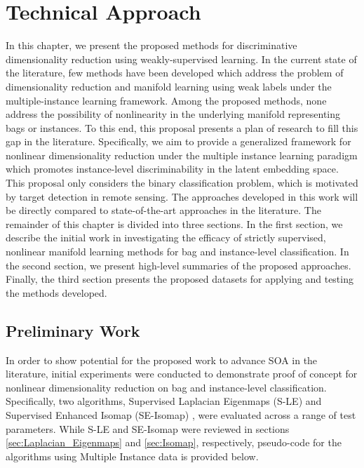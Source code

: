 \chapter{Technical Approach}
In this chapter, we present the proposed methods for discriminative dimensionality reduction using weakly-supervised learning. In the current state of the literature, few methods have been developed which address the problem of dimensionality reduction and manifold learning using weak labels under the multiple-instance learning framework.  Among the proposed methods, none address the possibility of nonlinearity in the underlying manifold representing bags or instances. To this end, this proposal presents a plan of research to fill this gap in the literature.  Specifically, we aim to provide a generalized framework for nonlinear dimensionality reduction under the multiple instance learning paradigm which promotes instance-level discriminability in the latent embedding space.  This proposal only considers the binary classification problem, which is motivated by target detection in remote  sensing. The approaches developed in this work will be directly compared to state-of-the-art approaches in the literature.  The remainder of this chapter is divided into three sections.  In the first section, we describe the initial work in investigating the efficacy of strictly supervised, nonlinear manifold learning methods for bag and instance-level classification.  In the second section, we present high-level summaries of the proposed approaches.  Finally, the third section presents the proposed datasets for applying and testing the methods developed. 

\section{Preliminary Work}
In order to show potential for the proposed work to advance SOA in the literature, initial experiments were conducted to demonstrate proof of concept for nonlinear dimensionality reduction on bag and instance-level classification.  Specifically, two algorithms, Supervised Laplacian Eigenmaps (S-LE) \citep{Raducanu2012SupervisedNonlinearDimReduction} and Supervised Enhanced Isomap (SE-Isomap) \citep{Ribeiro2008SupervisedIsomap},  were evaluated across a range of test parameters.  While S-LE and SE-Isomap were reviewed in sections \ref{sec:Laplacian_Eigenmaps} and \ref{sec:Isomap}, respectively, pseudo-code for the algorithms using Multiple Instance data is provided below.  

